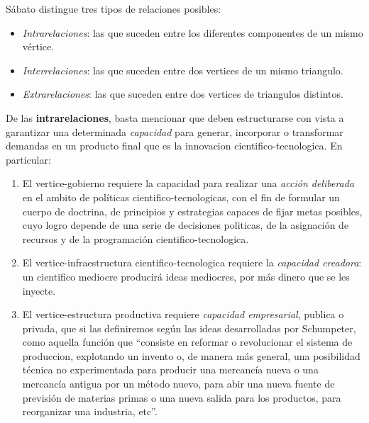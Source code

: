 Sábato distingue tres tipos de relaciones posibles:

\begin{itemize}
    \item \textit{Intrarelaciones}: las que suceden entre los diferentes componentes de un mismo vértice.
    \item \textit{Interrelaciones}: las que suceden entre dos vertices de un mismo triangulo.
    \item \textit{Extrarelaciones}: las que suceden entre dos vertices de triangulos distintos.
\end{itemize}

De las \textbf{intrarelaciones}, basta mencionar que deben estructurarse con vista a garantizar una determinada \textit{capacidad} para generar, incorporar o transformar demandas en un producto final que es la innovacion cientifico-tecnologica. En particular:


\begin{enumerate}
    \item El vertice-gobierno requiere la capacidad para realizar una \textit{acción deliberada} en el ambito de políticas cientifico-tecnologicas, con el fin de formular un cuerpo de doctrina, de principios y estrategias capaces de fijar metas posibles, cuyo logro depende de una serie de decisiones politicas, de la asignación de recursos y de la programación cientifico-tecnologica.
    \item El vertice-infraestructura cientifico-tecnologica requiere la \textit{capacidad creadora}: un cientifico mediocre producirá ideas mediocres, por más dinero que se les inyecte.
    \item El vertice-estructura productiva requiere \textit{capacidad empresarial}, publica o privada, que si las definiremos según las ideas desarrolladas por Schumpeter, como aquella función que ``consiste en reformar o revolucionar el sistema de produccion, explotando un invento o, de manera más general, una posibilidad técnica no experimentada para producir una mercancía nueva o una mercancía antigua por un método nuevo, para abir una nueva fuente de previsión de materias primas o una nueva salida para los productos, para reorganizar una industria, etc''.
\end{enumerate}

